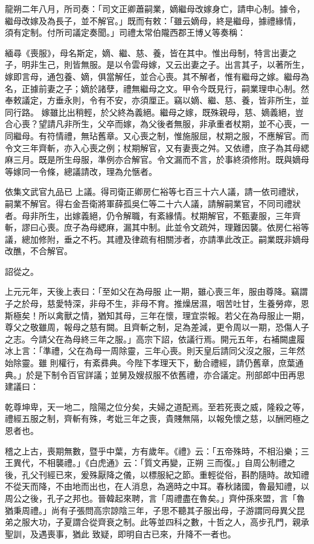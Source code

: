 \begin{pinyinscope}
 龍朔二年八月，所司奏：「司文正卿蕭嗣業，嫡繼母改嫁身亡，請申心制。據令，繼母改嫁及為長子，並不解官。」既而有敕：「雖云嫡母，終是繼母，據禮緣情，
 須有定制。付所司議定奏聞。」司禮太常伯隴西郡王博乂等奏稱：



 緬尋《喪服》，母名斯定，嫡、繼、慈、養，皆在其中。惟出母制，特言出妻之子，明非生己，則皆無服。是以令雲母嫁，又云出妻之子。出言其子，以著所生，嫁即言母，通包養、嫡，俱當解任，並合心喪。其不解者，惟有繼母之嫁。繼母為名，正據前妻之子；嫡於諸孽，禮無繼母之文。甲令今既見行，嗣業理申心制。然奉敕議定，方垂永則，令有不安，亦須厘正。竊以嫡、繼、慈、養，皆非所生，並同行路。
 嫁雖比出稍輕，於父終為義絕。繼母之嫁，既殊親母，慈、嫡義絕，豈合心喪？望請凡非所生，父卒而嫁，為父後者無服，非承重者杖期，並不心喪，一同繼母。有符情禮，無玷舊章。又心喪之制，惟施服屈，杖期之服，不應解官。而令文三年齊斬，亦入心喪之例；杖期解官，又有妻喪之舛。又依禮，庶子為其母緦麻三月。既是所生母服，準例亦合解官。令文漏而不言，於事終須修附。既與嫡母等嫁同一令條，總議請改，理為允愜者。



 依集文武官九品已
 上議。得司衛正卿房仁裕等七百三十六人議，請一依司禮狀，嗣業不解官。得右金吾衛將軍薛孤吳仁等二十六人議，請解嗣業官，不同司禮狀者。母非所生，出嫁義絕，仍令解職，有紊緣情。杖期解官，不甄妻服，三年齊斬，謬曰心喪。庶子為母緦麻，漏其中制。此並令文疏舛，理難因襲。依房仁裕等議，總加修附，垂之不朽。其禮及律疏有相關涉者，亦請準此改正。嗣業既非嫡母改醮，不合解官。



 詔從之。



 上元元年，天後上表曰：「至如父在為母服
 止一期，雖心喪三年，服由尊降。竊謂子之於母，慈愛特深，非母不生，非母不育。推燥居濕，咽苦吐甘，生養勞瘁，恩斯極矣！所以禽獸之情，猶知其母，三年在懷，理宜崇報。若父在為母服止一期，尊父之敬雖周，報母之慈有闕。且齊斬之制，足為差減，更令周以一期，恐傷人子之志。今請父在為母終三年之服。」高宗下詔，依議行焉。開元五年，右補闕盧履冰上言：「準禮，父在為母一周除靈，三年心喪。則天皇后請同父沒之服，三年然始除靈。雖
 則權行，有紊彞典。今陛下孝理天下，動合禮經，請仍舊章，庶葉通典。」於是下制令百官詳議；並舅及嫂叔服不依舊禮，亦合議定。刑部郎中田再思建議曰：



 乾尊坤卑，天一地二，陰陽之位分矣，夫婦之道配焉。至若死喪之威，隆殺之等，禮經五服之制，齊斬有殊，考妣三年之喪，貴賤無隔，以報免懷之慈，以酬罔極之恩者也。



 稽之上古，喪期無數，暨乎中葉，方有歲年。《禮》云：「五帝殊時，不相沿樂；三王異代，不相襲禮。」《白虎通》云：「質文再變，正朔
 三而復。」自周公制禮之後，孔父刊經已來，爰殊厭降之儀，以標服紀之節。重輕從俗，斟酌隨時。故知禮不從天而降，不由地而出也，在人消息，為適時之中耳。春秋諸國，魯最知禮，以周公之後，孔子之邦也。晉韓起來聘，言「周禮盡在魯矣。」齊仲孫來盟，言「魯猶秉周禮。」尚有子張問高宗諒陰三年，子思不聽其子服出母，子游謂同母異父昆弟之服大功，子夏謂合從齊衰之制。此等並四科之數，十哲之人，高步孔門，親承聖訓，及遇喪事，猶此
 致疑，即明自古已來，升降不一者也。




\end{pinyinscope}
